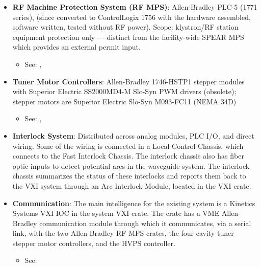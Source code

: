 {\begin{itemize}
  \begin{itemize}
  \tightlist
  \item
    See: 
  \end{itemize}
\item
  \textbf{RF Machine Protection System (RF MPS)}: Allen-Bradley PLC-5 (1771 series), (since converted to ControlLogix 1756 with the hardware assembled, software written, tested without RF power). Scope: klystron/RF station equipment protection only --- distinct from the facility-wide SPEAR MPS which provides an external permit input.

  \begin{itemize}
  \tightlist
  \item
    See: , 
  \end{itemize}
\item
  \textbf{Tuner Motor Controllers}: Allen-Bradley 1746-HSTP1 stepper modules with Superior Electric SS2000MD4-M Slo-Syn PWM drivers (obsolete); stepper motors are Superior Electric Slo-Syn M093-FC11 (NEMA 34D)

  \begin{itemize}
  \tightlist
  \item
    See: , 
  \end{itemize}
\item
  \textbf{Interlock System}: Distributed across analog modules, PLC I/O, and direct wiring. Some of the wiring is connected in a Local Control Chassis, which connects to the Fast Interlock Chassis. The interlock chassis also has fiber optic inputs to detect potential arcs in the waveguide system. The interlock chassis summarizes the status of these interlocks and reports them back to the VXI system through an Arc Interlock Module, located in the VXI crate.
\item
  \textbf{Communication}: The main intelligence for the existing system is a Kinetics Systems VXI IOC in the system VXI crate. The crate has a VME Allen-Bradley communication module through which it communicates, via a serial link, with the two Allen-Bradley RF MPS crates, the four cavity tuner stepper motor controllers, and the HVPS controller.

  \begin{itemize}
  \tightlist
  \item
    See: 
  \end{itemize}
\end{itemize}

}
